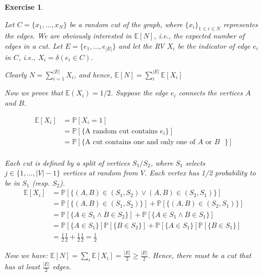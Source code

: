 \documentclass{article}
\newtheorem{exo}{Exercise}
\def\P{\mathbb{P}}
\def\E{\mathbb{E}}
\begin{document}
\begin{exo}{\ \\}

Let $C = \{x_1, \dots, x_N\}$ be a random cut of the graph, where $\{x_i\}_{1\leq i \leq N}$ representes the edges. We are obviously interested in $\E[N]$, i.e., the expected number of edges in a cut. Let $E = \{e_1, \dots, e_{|E|}\}$ and let the RV $X_i$ be the indicator of edge $e_i$ in $C$, i.e., $X_i = \delta(e_i \in C)$.


Clearly $\displaystyle N = \sum_{i=1}^{|E|}X_i$, and hence, $\displaystyle \E[N]= \sum_i^{|E|} \E[X_i]$

Now we prove that $\E (X_i) = 1/2$. Suppose the edge $e_i$ connects the vertices $A$ and $B$. 

\begin{align*}
    \E[X_i] &= \P[X_i=1] \\
            &= \P[\{\text{A random cut contains $e_i$}\}] \\
            &= \P[\{\text{A cut contains one and only one of $A$ or $B$  }\}] \\
\end{align*}

Each cut is defined by a split of vertices $S_1 / S_2$, where $S_1$ selects $j \in \{1, \dots, |V|-1\}$ vertices at random from $V$. Each vertex has 1/2 probability to be in $S_1$ (resp. $S_2$). 
\begin{align*}
    \E[X_i] &= \P[\{ (A,B)\in (S_1, S_2) \lor (A,B)\in (S_2, S_1)\}]  \\
            &= \P[\{ (A,B)\in (S_1, S_2)\}] + \P[\{(A,B)\in (S_2, S_1)\}] \\
            &= \P[\{ A \in S_1 \land B \in S_2 \}] + \P[\{  A \in S_1 \land B \in S_1\}] \\
            &= \P[\{ A \in S_1\}]\P[\{ B \in S_2 \}] + \P[\{A \in S_1\}] \P[\{B \in S_1\}] \\
            &=  \frac{1}{2} \frac{1}{2}+  \frac{1}{2} \frac{1}{2}  =  \frac{1}{2}
\end{align*}

Now we have: $\E[N] = \sum_i \E[X_i] = \frac{|E|}{2} \geq \frac{|E|}{2}$. Hence, there must be a cut that has at least $\frac{|E|}{2}$ edges.

\end{exo}
\end{document}
